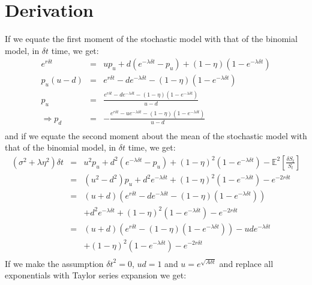 \documentclass[a4paper,11pt,oneside]{report}
\theoremstyle{plain}
\theoremstyle{definition}
\def\E{\mathbb{E}}
\def\S{\ensuremath{S_t}\xspace}
\def\DS{\ensuremath{\delta S_t}\xspace}
\def\Dt{\ensuremath{\delta t}\xspace}
\def\u{\ensuremath{u}\xspace}
\def\d{\ensuremath{d}\xspace}
\def\pu{\ensuremath{p_\u}\xspace}
\def\pd{\ensuremath{p_\d}\xspace}
\begin{document}
\section{Derivation}
If we equate the first moment of the stochastic model with that of the binomial model, in \Dt time, we get:
\begin{displaymath}\begin{array}{rcl}
 e^{r\Dt}       &=& \u\pu + \d(e^{-\lambda\Dt} - \pu) + (1 - \eta)(1 - e^{-\lambda\Dt}) \\
 \pu(\u - \d)   &=& e^{r\Dt} - \d e^{-\lambda\Dt} - (1 - \eta)(1 - e^{-\lambda\Dt}) \\
 \pu            &=& \frac{e^{r\Dt} - \d e^{-\lambda\Dt} - (1 - \eta)(1 - e^{-\lambda\Dt})}{\u - \d} \\
 \Rightarrow\pd &=& -\frac{e^{r\Dt} - \u e^{-\lambda\Dt} - (1 - \eta)(1 - e^{-\lambda\Dt})}{\u - \d} \\
\end{array}\end{displaymath}
and if we equate the second moment about the mean of the stochastic model with that of the binomial model, in \Dt time, we get:
\begin{displaymath}\begin{array}{rcl}
 (\sigma^2 + \lambda\eta^2)\Dt &=& \u^2\pu + \d^2(e^{-\lambda\Dt} - \pu) + (1 - \eta)^2(1 - e^{-\lambda\Dt}) - \E^2[\frac{\DS}{\S}] \\
                        &=& (\u^2 - \d^2)\pu + \d^2 e^{-\lambda\Dt} +  (1 - \eta)^2(1 - e^{-\lambda\Dt}) - e^{-2r\Dt} \\
                        &=& (\u + \d)(e^{r\Dt} - \d e^{-\lambda\Dt} - (1 - \eta)(1 - e^{-\lambda\Dt})) \\
                        & & + \d^2 e^{-\lambda\Dt} + (1 - \eta)^2(1 - e^{-\lambda\Dt}) - e^{-2r\Dt} \\
                        &=& (\u + \d)(e^{r\Dt} - (1 - \eta)(1 - e^{-\lambda\Dt})) - \u\d e^{-\lambda\Dt} \\
                        & & + (1 - \eta)^2(1 - e^{-\lambda\Dt}) - e^{-2r\Dt} \\
\end{array}\end{displaymath}
If we make the assumption $\Dt^2 = 0$, $\u\d = 1$ and $\u = e^{\sqrt{A\Dt}}$ and replace all exponentials with Taylor series expansion we get:
\end{document}
